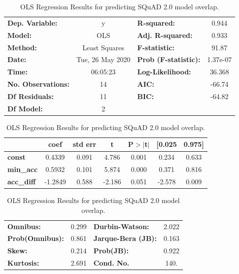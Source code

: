\documentclass[11pt,a4paper]{article}
\begin{document}
\begin{table}
\begin{center}
\begin{tabular}{lclc}
\toprule
\textbf{Dep. Variable:}    &        y         & \textbf{  R-squared:         } &     0.944   \\
\textbf{Model:}            &       OLS        & \textbf{  Adj. R-squared:    } &     0.933   \\
\textbf{Method:}           &  Least Squares   & \textbf{  F-statistic:       } &     91.87   \\
\textbf{Date:}             & Tue, 26 May 2020 & \textbf{  Prob (F-statistic):} &  1.37e-07   \\
\textbf{Time:}             &     06:05:23     & \textbf{  Log-Likelihood:    } &    36.368   \\
\textbf{No. Observations:} &          14      & \textbf{  AIC:               } &    -66.74   \\
\textbf{Df Residuals:}     &          11      & \textbf{  BIC:               } &    -64.82   \\
\textbf{Df Model:}         &           2      & \textbf{                     } &             \\
\bottomrule
\end{tabular}
\begin{tabular}{lcccccc}
               & \textbf{coef} & \textbf{std err} & \textbf{t} & \textbf{P$> |$t$|$} & \textbf{[0.025} & \textbf{0.975]}  \\
\midrule
\textbf{const} &       0.4339  &        0.091     &     4.786  &         0.001        &        0.234    &        0.633     \\
\textbf{min\_acc}    &       0.5932  &        0.101     &     5.874  &         0.000        &        0.371    &        0.816     \\
\textbf{acc\_diff}    &      -1.2849  &        0.588     &    -2.186  &         0.051        &       -2.578    &        0.009     \\
\bottomrule
\end{tabular}
\begin{tabular}{lclc}
\textbf{Omnibus:}       &  0.299 & \textbf{  Durbin-Watson:     } &    2.022  \\
\textbf{Prob(Omnibus):} &  0.861 & \textbf{  Jarque-Bera (JB):  } &    0.163  \\
\textbf{Skew:}          &  0.214 & \textbf{  Prob(JB):          } &    0.922  \\
\textbf{Kurtosis:}      &  2.691 & \textbf{  Cond. No.          } &     140.  \\
\bottomrule
\end{tabular}
\caption{OLS Regression Results for predicting SQuAD 2.0 model overlap.}
\label{tab:app_ols_squad}
\end{center}
\end{table}
\end{document}
